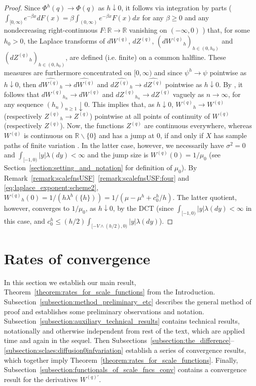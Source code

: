 \documentclass[pdftex,oneside,11pt,reqno]{amsart}
\theoremstyle{definition}
\theoremstyle{theorem}
\theoremstyle{remark}
\numberwithin{equation}{section}
\numberwithin{definition}{section}
\begin{document}
\begin{proof}
Since $\Phi^h(q)\to \Phi(q)$ as $h\downarrow 0$, it follows via integration by parts ($\int_{[0,\infty)}e^{-\beta x}dF(x)=\beta\int_{(0,\infty)}e^{-\beta x}F(x)dx$ for any $\beta\geq 0$ and any nondecreasing right-continuous $F:\mathbb{R}\to\mathbb{R}$ vanishing on $(-\infty,0)$  \cite[Chapter 0, (4.5) Proposition]{revuzyor}) that, for some $h_0>0$, the Laplace transforms of $d{W^{(q)}}$, $d{Z^{(q)}}$, $(d{W^{(q)}}_h)_{h\in (0,h_0)}$ and $(d{Z^{(q)}}_h)_{h\in (0,h_0)}$, are defined (i.e. finite) on a common halfline. These measures are furthermore concentrated on $[0,\infty)$  and since $\psi^h\to\psi$ pointwise as $h\downarrow 0$, then $\widehat{d{W^{(q)}}_h}\to \widehat{d{W^{(q)}}}$ and $\widehat{d{Z^{(q)}}_h}\to \widehat{d{Z^{(q)}}}$ pointwise as $h\downarrow 0$. By \cite[p. 110, Theorem 8.5]{bhattacharya}, it follows that $d{W^{(q)}}_{h_n}\to d{W^{(q)}}$ and $d{Z^{(q)}}_{h_n}\to d{Z^{(q)}}$ vaguely as $n\to\infty$, for any sequence $(h_n)_{n\geq 1}\downarrow 0$. This implies that, as $h\downarrow 0$, ${W^{(q)}}_{h}\to {W^{(q)}}$ (respectively ${Z^{(q)}}_{h}\to {Z^{(q)}}$) pointwise at all points of continuity of ${W^{(q)}}$ (respectively ${Z^{(q)}}$). Now, the functions ${Z^{(q)}}$ are continuous everywhere, whereas ${W^{(q)}}$ is continuous on $\mathbb{R}\backslash \{0\}$ and has a jump at $0$, if and only if $X$ has sample paths of finite variation \cite[p. 222, Lemma 8.6]{kyprianou}. In the latter case, however, we necessarily have ${\sigma^2}=0$ and $\int_{[-1,0)}\vert y\vert{\lambda}(dy)<\infty$ \cite[p. 140, Theorem 21.9]{sato} and the jump size is ${W^{(q)}}(0)=1/\mu_0$ (see Section~\ref{section:setting_and_notation} for definition of $\mu_0$). By Remark~\ref{remark:scalefnsUSF}~\ref{remark:scalefnsUSF:four} and \eqref{eq:laplace_exponent:scheme2}, ${W^{(q)}}_h(0)=1/(h{\lambda}^h(\{h\}))=1/(\mu-\mu^h+c_0^h/h)$. The latter quotient, however, converges to $1/\mu_0$, as $h\downarrow 0$, by the DCT  (since $\int_{[-1,0)}\vert y\vert{\lambda}(dy)<\infty$ in this case, and  $c_0^h\leq (h/2)\int_{[-V\land (h/2),0)}\vert y\vert\lambda(dy)$).
\end{proof}

\section{Rates of convergence}\label{section:convergence_rates}
In this section we establish our main result, Theorem~\ref{theorem:rates_for_scale_functions} from the Introduction. Subsection~\ref{subsection:method_preliminary_etc} describes the general method of proof and establishes some preliminary observations and notation. Subsection~\ref{subsection:auxiliary_technical_results}
contains technical results, notationally and otherwise independent from rest of the text, which are applied time and again in the sequel. Then Subsections~\ref{subsection:the_difference}--\ref{subsection:sclaes:diffusion0infvariation} establish a series of convergence results, which together imply Theorem~\ref{theorem:rates_for_scale_functions}. Finally, Subsection~\ref{subsection:functionals_of_scale_fncs_conv} contains a convergence result for the derivatives ${W^{(q)\prime}}$. 
\end{document}
